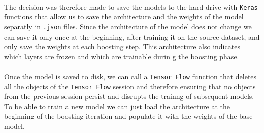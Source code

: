 \documentclass[11 pt]{article}
\begin{document}
\paragraph{}The decision was therefore made to save the models to the hard drive with \texttt{Keras} functions that allow us to save the architecture and the weights of the model separatly in \texttt{.json} files. Since the architecture of the model does not change we can save it only once at the beginning, after training it on the source dataset, and only save the weights at each boosting step. This architecture also indicates which layers are frozen and which are trainable durin g the boosting phase.

\paragraph{}Once the model is saved to disk, we can call a \texttt{Tensor Flow} function that deletes all the objects of the \texttt{Tensor Flow} session and therefore ensuring that no objects from the previous session persist and disrupts the trainng of subsequent models. To be able to train a new model we can just load the architecture at the beginning of the boosting iteration and populate it with the weights of the base model. 

\end{document}
